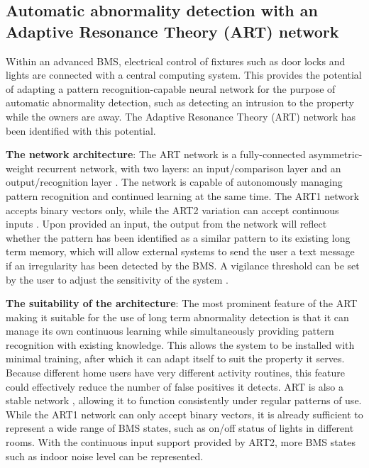 \documentclass[10pt, oneside]{article}
\begin{document}
\subsection{Automatic abnormality detection with an Adaptive Resonance Theory (ART) network} \label{subset:art-additional}

Within an advanced BMS, electrical control of fixtures such as door locks and lights are connected with a central computing system. This provides the potential of adapting a pattern recognition-capable neural network for the purpose of automatic abnormality detection, such as detecting an intrusion to the property while the owners are away. The Adaptive Resonance Theory (ART) network has been identified with this potential.

\textbf{The network architecture}: The ART network is a fully-connected asymmetric-weight recurrent network, with two layers: an input/comparison layer and an output/recognition layer \cite[p. 7]{art-lecture}. The network is capable of autonomously managing pattern recognition and continued learning at the same time. The ART1 network accepts binary vectors only, while the ART2 variation can accept continuous inputs \cite[p. 21]{art-lecture}. Upon provided an input, the output from the network will reflect whether the pattern has been identified as a similar pattern to its existing long term memory, which will allow external systems to send the user a text message if an irregularity has been detected by the BMS. A vigilance threshold can be set by the user to adjust the sensitivity of the system \cite[p. 17]{art-lecture}.

\textbf{The suitability of the architecture}: The most prominent feature of the ART making it suitable for the use of long term abnormality detection is that it can manage its own continuous learning while simultaneously providing pattern recognition with existing knowledge. This allows the system to be installed with minimal training, after which it can adapt itself to suit the property it serves. Because different home users have very different activity routines, this feature could effectively reduce the number of false positives it detects. ART is also a stable network \cite[p. 5]{art-lecture}, allowing it to function consistently under regular patterns of use. While the ART1 network can only accept binary vectors, it is already sufficient to represent a wide range of BMS states, such as on/off status of lights in different rooms. With the continuous input support provided by ART2, more BMS states such as indoor noise level can be represented.
\end{document}
